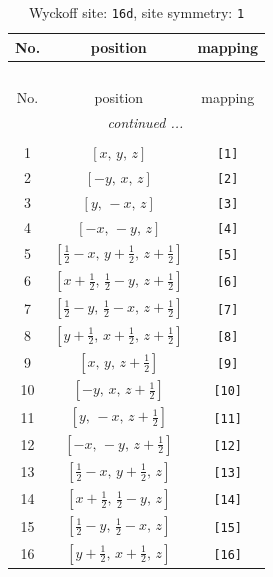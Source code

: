 \documentclass[fleqn,8pt]{jsarticle}
\begin{document}
\begin{longtable}{ccc}
\caption{Wyckoff site: {\tt 16d}, site symmetry: {\tt 1}}
 \\
 \hline \hline
No. & position & mapping \\ \hline \endfirsthead

\multicolumn{2}{l}{\tablename\ \thetable{}} \\
 \hline \hline
No. & position & mapping \\ \hline \endhead

 \hline \hline
\multicolumn{2}{r}{\footnotesize\it continued ...} \\ \endfoot

 \hline \hline
\multicolumn{2}{r}{} \\ \endlastfoot

1 & $\left[ x,\, y,\, z \right]$ & {\tt [1]} \\ \hline
2 & $\left[ - y,\, x,\, z \right]$ & {\tt [2]} \\ \hline
3 & $\left[ y,\, - x,\, z \right]$ & {\tt [3]} \\ \hline
4 & $\left[ - x,\, - y,\, z \right]$ & {\tt [4]} \\ \hline
5 & $\left[ \frac{1}{2} - x,\, y + \frac{1}{2},\, z + \frac{1}{2} \right]$ & {\tt [5]} \\ \hline
6 & $\left[ x + \frac{1}{2},\, \frac{1}{2} - y,\, z + \frac{1}{2} \right]$ & {\tt [6]} \\ \hline
7 & $\left[ \frac{1}{2} - y,\, \frac{1}{2} - x,\, z + \frac{1}{2} \right]$ & {\tt [7]} \\ \hline
8 & $\left[ y + \frac{1}{2},\, x + \frac{1}{2},\, z + \frac{1}{2} \right]$ & {\tt [8]} \\ \hline
9 & $\left[ x,\, y,\, z + \frac{1}{2} \right]$ & {\tt [9]} \\ \hline
10 & $\left[ - y,\, x,\, z + \frac{1}{2} \right]$ & {\tt [10]} \\ \hline
11 & $\left[ y,\, - x,\, z + \frac{1}{2} \right]$ & {\tt [11]} \\ \hline
12 & $\left[ - x,\, - y,\, z + \frac{1}{2} \right]$ & {\tt [12]} \\ \hline
13 & $\left[ \frac{1}{2} - x,\, y + \frac{1}{2},\, z \right]$ & {\tt [13]} \\ \hline
14 & $\left[ x + \frac{1}{2},\, \frac{1}{2} - y,\, z \right]$ & {\tt [14]} \\ \hline
15 & $\left[ \frac{1}{2} - y,\, \frac{1}{2} - x,\, z \right]$ & {\tt [15]} \\ \hline
16 & $\left[ y + \frac{1}{2},\, x + \frac{1}{2},\, z \right]$ & {\tt [16]} \\
\end{longtable}
\end{document}
